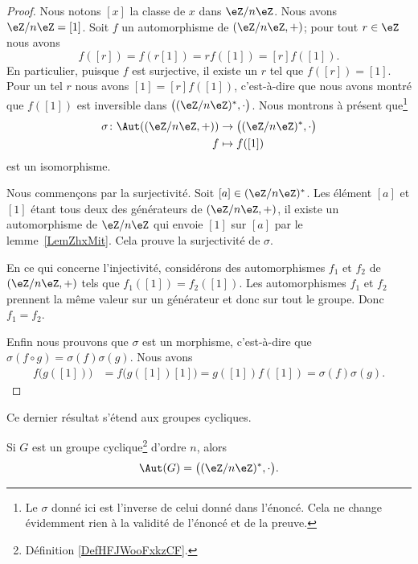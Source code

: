 \begin{proof}
	Nous notons \( [x]\) la classe de \( x\) dans \( \eZ/n\eZ\). Nous avons \( \eZ/n\eZ=[1]\). Soit \( f\) un automorphisme de \( (\eZ/n\eZ,+)\); pour tout \( r\in \eZ\) nous avons
	\begin{equation}
		f([r])=f(r[1])=rf([1])=[r]f([1]).
	\end{equation}
	En particulier, puisque \( f\) est surjective, il existe un \( r\) tel que \( f([r])=[1]\). Pour un tel \( r\) nous avons \( [1]=[r]f([1])\), c'est-à-dire que nous avons montré que \( f([1])\) est inversible dans \(  \big( (\eZ/n\eZ)^*,\cdot\big)\). Nous montrons à présent que\footnote{Le \( \sigma\) donné ici est l'inverse de celui donné dans l'énoncé. Cela ne change évidemment rien à la validité de l'énoncé et de la preuve.}
	\begin{equation}
		\begin{aligned}
			\sigma\colon \Aut( (\eZ/n\eZ,+)) & \to \big( (\eZ/n\eZ)^*,\cdot \big) \\
			f                                & \mapsto f([1])
		\end{aligned}
	\end{equation}
	est un isomorphisme.

	Nous commençons par la surjectivité. Soit \( [a]\in (\eZ/n\eZ)^*\). Les élément \( [a]\) et \( [1]\) étant tous deux des générateurs de \( (\eZ/n\eZ,+)\), il existe un automorphisme de \( \eZ/n\eZ\) qui envoie \( [1]\) sur \( [a]\) par le lemme~\ref{LemZhxMit}. Cela prouve la surjectivité de \( \sigma\).

	En ce qui concerne l'injectivité, considérons des automorphismes \( f_1\) et \( f_2\) de \( (\eZ/n\eZ,+)\) tels que \( f_1([1])=f_2([1])\). Les automorphismes \( f_1\) et \( f_2\) prennent la même valeur sur un générateur et donc sur tout le groupe. Donc \( f_1=f_2\).

	Enfin nous prouvons que \( \sigma\) est un morphisme, c'est-à-dire que \( \sigma(f\circ g)=\sigma(f)\sigma(g)\). Nous avons
	\begin{subequations}
		\begin{align}
			f\big( g([1]) \big) & =f\big( g([1])[1] \big)=g([1])f([1])=\sigma(f)\sigma(g).
		\end{align}
	\end{subequations}
\end{proof}

Ce dernier résultat s'étend aux groupes cycliques.
\begin{proposition}     \label{PROPooBZOMooVOHoYf}
	Si \( G\) est un groupe cyclique\footnote{Définition \ref{DefHFJWooFxkzCF}.} d'ordre \( n\), alors
	\begin{equation}
        \Aut(G)=\big( (\eZ/n\eZ)^*,\cdot\big).
	\end{equation}
\end{proposition}

